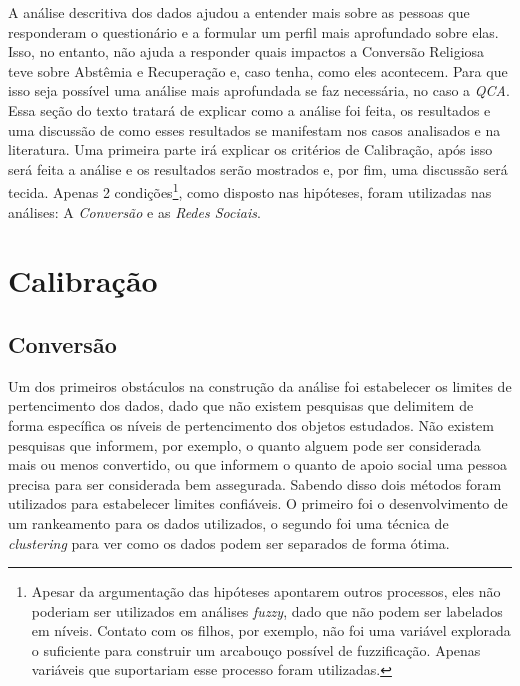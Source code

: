 \documentclass[
	12pt,				%
	oneside,			%
	a4paper,			%
	sumario=tradicional,
	english,			%
	brazil				%
	]{abntex2}
\begin{document}
A análise descritiva dos dados ajudou a entender mais sobre as pessoas que responderam o questionário e a formular um perfil mais aprofundado sobre elas. Isso, no entanto, não ajuda a responder quais impactos a Conversão Religiosa teve sobre Abstêmia e Recuperação e, caso tenha, como eles acontecem. Para que isso seja possível uma análise mais aprofundada se faz necessária, no caso a \emph{QCA}. Essa seção do texto tratará de explicar como a análise foi feita, os resultados e uma discussão de como esses resultados se manifestam nos casos analisados e na literatura. Uma primeira parte irá explicar os critérios de Calibração, após isso será feita a análise e os resultados serão mostrados e, por fim, uma discussão será tecida. Apenas 2 condições\footnote{Apesar da argumentação das hipóteses apontarem outros processos, eles não poderiam ser utilizados em análises \emph{fuzzy}, dado que não podem ser labelados em níveis. Contato com os filhos, por exemplo, não foi uma variável explorada o suficiente para construir um arcabouço possível de fuzzificação. Apenas variáveis que suportariam esse processo foram utilizadas.}, como disposto nas hipóteses, foram utilizadas nas análises: A \emph{Conversão} e as \emph{Redes Sociais}.

\hypertarget{calibrauxe7uxe3o}{%
\section{Calibração}\label{calibrauxe7uxe3o}}

\hypertarget{conversuxe3o}{%
\subsection{Conversão}\label{conversuxe3o}}

Um dos primeiros obstáculos na construção da análise foi estabelecer os limites de pertencimento dos dados, dado que não existem pesquisas que delimitem de forma específica os níveis de pertencimento dos objetos estudados. Não existem pesquisas que informem, por exemplo, o quanto alguem pode ser considerada mais ou menos convertido, ou que informem o quanto de apoio social uma pessoa precisa para ser considerada bem assegurada. Sabendo disso dois métodos foram utilizados para estabelecer limites confiáveis. O primeiro foi o desenvolvimento de um rankeamento para os dados utilizados, o segundo foi uma técnica de \emph{clustering} para ver como os dados podem ser separados de forma ótima.
\end{document}
